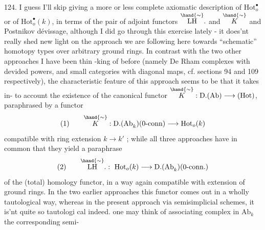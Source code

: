 
124.   I guess I'll skip giving a more  or less complete axiomatic
description of $\mathrm{Hot}^{\bullet}_{o}$ or of $\mathrm{Hot}^{\bullet}_{o}(k)$,  in terms of the pair of adjoint
functors $\overset{\hand{\sim}}{\mathrm{LH}}.$ and $\overset{\hand{\sim}}{K}$ and Postnikov dévissage,  although I did go through
this exercise lately - it does'nt really shed new light on the approach
we are following here towards ``schematic'' homotopy types over arbitrary
ground rings.  In contrast with the two other approaches I have been thin%
-king of before (namely De Rham complexes with devided powers,  and small
categories with diagonal maps,  cf. sections 94 and 109 respectively),
the characteristic feature of this approach seems to be that it takes in-%
to account the existence of the canonical functor  
  $\overset{\hand{\sim}}{K} : \mathrm{D.(Ab)} \longrightarrow (\mathrm{Hot})$,  paraphrased by a functor
\[ (1) \qquad \overset{\hand{\sim}}{K} : \mathrm{D.(Ab}_k)(\text{0-conn}) \longrightarrow \mathrm{Hot}_o(k) \]
compatible with ring extension $k \to k'$ ;  while all three approaches have
in common  that they yield a paraphrase
\[ (2) \qquad \overset{\hand{\sim}}{\mathrm{LH}}. :\ \mathrm{Hot}_o(k) \longrightarrow \mathrm{D.(Ab}_k)(\text{0-conn.}) \]
of the  (total) homology functor,  in a way again compatible with
extension of ground rings.  In the two earlier approaches this  functor
comes out in a wholly tautological way,  whereas in the
present approach via semisimplicial schemes,  it is'nt quite so tautologi%
cal indeed.   
 
  one may think
of associating  complex in $\mathrm{Ab}_k$  the corresponding semi-%
